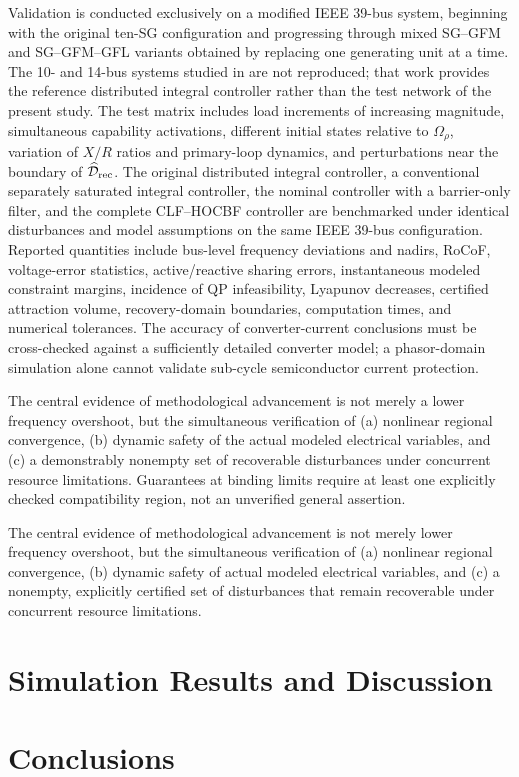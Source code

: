 \documentclass[11pt,twocolumn]{article}
\begin{document}
Validation is conducted exclusively on a modified IEEE 39-bus system, beginning with the original ten-SG configuration and progressing through mixed SG--GFM and SG--GFM--GFL variants obtained by replacing one generating unit at a time. The 10- and 14-bus systems studied in \cite{Kavvathas2025Resilient} are not reproduced; that work provides the reference distributed integral controller rather than the test network of the present study. The test matrix includes load increments of increasing magnitude, simultaneous capability activations, different initial states relative to $\Omega_\rho$, variation of $X/R$ ratios and primary-loop dynamics, and perturbations near the boundary of $\widehat{\mathcal D}_{\rm rec}$. The original distributed integral controller, a conventional separately saturated integral controller, the nominal controller with a barrier-only filter, and the complete CLF--HOCBF controller are benchmarked under identical disturbances and model assumptions on the same IEEE 39-bus configuration. Reported quantities include bus-level frequency deviations and nadirs, RoCoF, voltage-error statistics, active/reactive sharing errors, instantaneous modeled constraint margins, incidence of QP infeasibility, Lyapunov decreases, certified attraction volume, recovery-domain boundaries, computation times, and numerical tolerances. The accuracy of converter-current conclusions must be cross-checked against a sufficiently detailed converter model; a phasor-domain simulation alone cannot validate sub-cycle semiconductor current protection.

The central evidence of methodological advancement is not merely a lower frequency overshoot, but the simultaneous verification of (a) nonlinear regional convergence, (b) dynamic safety of the actual modeled electrical variables, and (c) a demonstrably nonempty set of recoverable disturbances under concurrent resource limitations. Guarantees at binding limits require at least one explicitly checked compatibility region, not an unverified general assertion.

The central evidence of methodological advancement is not merely lower frequency overshoot, but the simultaneous verification of (a) nonlinear regional convergence, (b) dynamic safety of actual modeled electrical variables, and (c) a nonempty, explicitly certified set of disturbances that remain recoverable under concurrent resource limitations.
\section{Simulation Results and Discussion}
\label{sec:results}

\section{Conclusions}
\label{sec:conclusions}



\end{document}
